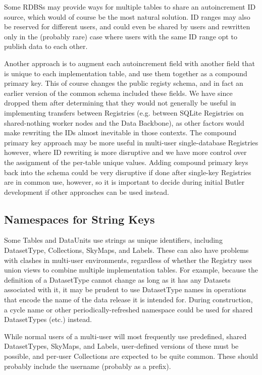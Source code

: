\documentclass[DM,toc]{lsstdoc}
\begin{document}
Some RDBSs may provide ways for multiple tables to share an autoincrement ID source, which would of course be the most natural solution.
ID ranges may also be reserved for different users, and could even be shared by users and rewritten only in the (probably rare) case where users with the same ID range opt to publish data to each other.

Another approach is to augment each autoincrement field with another field that is unique to each implementation table, and use them together as a compound primary key.
This of course changes the public registy schema, and in fact an earlier version of the common schema included these fields.
We have since dropped them after determining that they would not generally be useful in implementing transfers between Registries (e.g. between SQLite Registries on shared-nothing worker nodes and the Data Backbone), as other factors would make rewriting the IDs almost inevitable in those contexts.
The compound primary key approach may be more useful in multi-user single-database Registries however, where ID rewriting is more disruptive and we have more control over the assignment of the per-table unique values.
Adding compound primary keys back into the schema could be very disruptive if done after single-key Registries are in common use, however, so it is important to decide during initial Butler development if other approaches can be used instead.

\subsection{Namespaces for String Keys}
\label{sec:namespaces-for-string-keys}

Some Tables and DataUnits use strings as unique identifiers, including DatasetType, Collections, SkyMaps, and Labels.
These can also have problems with clashes in multi-user environments, regardless of whether the Registry uses union views to combine multiple implementation tables.
For example, because the definition of a DatasetType cannot change as long as it has any Datasets associated with it, it may be prudent to use DatasetType names in operations that encode the name of the data release it is intended for.
During construction, a cycle name or other periodically-refreshed namespace could be used for shared DatasetTypes (etc.) instead.

While normal users of a multi-user will most frequently use predefined, shared DatasetTypes, SkyMaps, and Labels, user-defined versions of these must be possible, and per-user Collections are expected to be quite common.
These should probably include the username (probably as a prefix).
\end{document}
